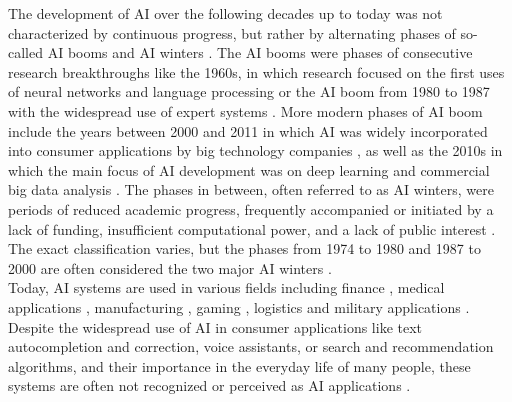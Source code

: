 \documentclass[a4paper, conference]{IEEEtran}
\begin{document}
The development of AI over the following decades up to today was not characterized by continuous progress, but rather by alternating phases of so-called AI booms and AI winters \cite{AiWinterLessons, briefHistory}. The AI booms were phases of consecutive research breakthroughs like the 1960s, in which research focused on the first uses of neural networks and language processing \cite[pp. 65-69]{aiModernApproach} or the AI boom from 1980 to 1987 with the widespread use of expert systems \cite[pp. 71-74]{aiModernApproach}. More modern phases of AI boom include the years between 2000 and 2011 in which AI was widely incorporated into consumer applications by big technology companies \cite{voiceAssistants}, as well as the 2010s in which the main focus of AI development was on deep learning and commercial big data analysis \cite[pp. 77-79, p.5]{aiModernApproach, briefHistory}. The phases in between, often referred to as AI winters, were periods of reduced academic progress, frequently accompanied or initiated by a lack of funding, insufficient computational power, and a lack of public interest \cite{AiWinterLessons, aiModernApproach}. The exact classification varies, but the phases from 1974 to 1980 and 1987 to 2000 are often considered the two major AI winters \cite{Toosi_2021, aiModernApproach}.\\

Today, AI systems are used in various fields including finance \cite[p. 1845]{aiModernApproach}, medical applications \cite[p. 84]{aiModernApproach}, manufacturing \cite[p. 293]{aiStructuresStrategies}, gaming \cite[pp. 45-46]{aiStructuresStrategies}, logistics \cite[pp. 82-83]{aiModernApproach} and military applications \cite[pp. 86, 1031]{aiModernApproach}. Despite the widespread use of AI in consumer applications like text autocompletion and correction, voice assistants, or search and recommendation algorithms, and their importance in the everyday life of many people, these systems are often not recognized or perceived as AI applications \cite{studyAIusage}.\\
\end{document}
